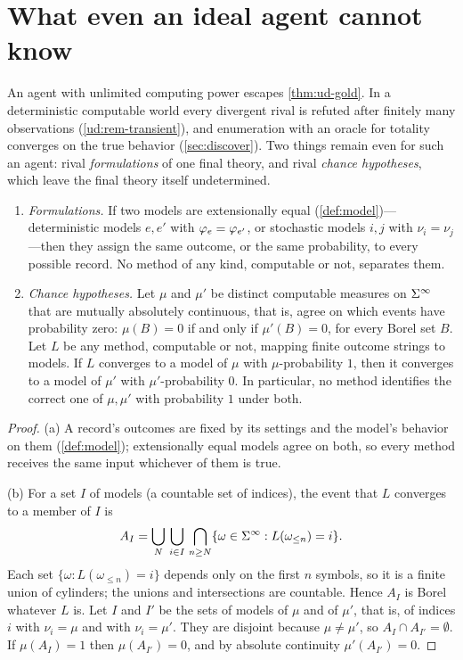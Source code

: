 \section{What even an ideal agent cannot know}\label{sec:ideal}

An agent with unlimited computing power escapes \cref{thm:ud-gold}. In a deterministic
computable world every divergent rival is refuted after finitely many observations
(\cref{ud:rem-transient}), and enumeration with an oracle for totality converges on the
true behavior (\cref{sec:discover}). Two things remain even for such an agent: rival
\emph{formulations} of one final theory, and rival \emph{chance hypotheses}, which leave
the final theory itself undetermined.

\begin{theorem}\label{thm:t5-permanent}
\leavevmode
\begin{enumerate}[label=(\alph*)]
  \item \emph{Formulations.} If two models are extensionally equal
        (\cref{def:model})---deterministic models $e,e'$ with $\varphi_{e}=\varphi_{e'}$, or
        stochastic models $i,j$ with $\nu_i=\nu_j$---then they assign the same
        outcome, or the same probability, to every possible record. No method of any kind, computable or not, separates
        them.
  \item \emph{Chance hypotheses.} Let $\mu$ and $\mu'$ be distinct computable
        measures on $\Sigma^{\infty}$ that are mutually absolutely continuous, that is, agree on
        which events have probability zero: $\mu(B)=0$ if and only if $\mu'(B)=0$, for
        every Borel set $B$. Let $L$ be any method, computable or not, mapping finite outcome
        strings to models. If $L$ converges to a model of $\mu$ with $\mu$-probability
        $1$, then it converges to a model of $\mu'$ with $\mu'$-probability $0$. In
        particular, no method identifies the correct one of $\mu,\mu'$ with probability
        $1$ under both.
\end{enumerate}
\end{theorem}

\begin{proof}
(a) A record's outcomes are fixed by its settings and the model's behavior on them
(\cref{def:model}); extensionally equal models agree on both, so every method receives
the same input whichever of them is true.

(b) For a set $I$ of models (a countable set of indices), the event that $L$ converges
to a member of $I$ is
\[
  A_I=\bigcup_{N}\,\bigcup_{i\in I}\,\bigcap_{n\ge N}\{\omega\in\Sigma^{\infty} : L(\omega_{\le n})=i\}.
\]
Each set $\{\omega : L(\omega_{\le n})=i\}$ depends only on the first $n$ symbols, so it
is a finite union of cylinders; the unions and intersections are countable. Hence $A_I$
is Borel whatever $L$ is. Let $I$ and $I'$ be the sets of models of
$\mu$ and of $\mu'$, that is, of indices $i$ with $\nu_i=\mu$ and with $\nu_i=\mu'$. They are disjoint because $\mu\neq\mu'$, so $A_I\cap A_{I'}=\emptyset$.
If $\mu(A_I)=1$ then $\mu(A_{I'})=0$, and by absolute continuity $\mu'(A_{I'})=0$.
\end{proof}


